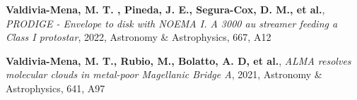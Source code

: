 \vspace{8pt}

\begin{cvitems} %
      \item{\textbf{Valdivia-Mena, M. T. , Pineda, J. E., Segura-Cox, D. M., et al.}, \textit{PRODIGE - Envelope to disk with NOEMA I. A 3000 au streamer feeding a Class I protostar}, 2022, Astronomy \& Astrophysics, 667, A12}
      \item{\textbf{Valdivia-Mena, M. T., Rubio, M., Bolatto, A. D, et al.}, \textit{ALMA resolves molecular clouds in metal-poor Magellanic Bridge A}, 2021, Astronomy \& Astrophysics, 641, A97}
\end{cvitems}
\vspace{8pt}
